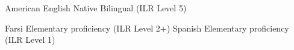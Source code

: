 
\begin{cvskills}

  \cvskill
    {American English} %
    {Native Bilingual (ILR Level 5)} %

  \cvskill
    {Farsi} %
    {Elementary proficiency (ILR Level 2+)} %
  \cvskill
    {Spanish} %
    {Elementary proficiency (ILR Level 1)} %

\end{cvskills}

